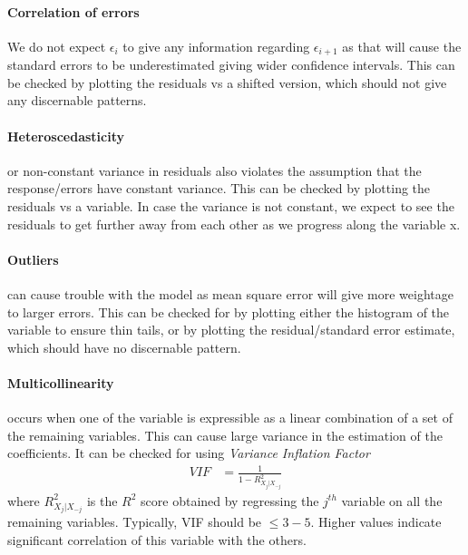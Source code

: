 \documentclass[../statistical_learning_notes.tex]{subfiles}
\begin{document}
\paragraph{Correlation of errors} We do not expect $\epsilon_{i}$ to give any information regarding $\epsilon_{i+1}$ as that will cause the standard errors to be underestimated giving wider confidence intervals. This can be checked by plotting the residuals vs a shifted version, which should not give any discernable patterns.

\paragraph{Heteroscedasticity} or non-constant variance in residuals also violates the assumption that the response/errors have constant variance. This can be checked by plotting the residuals vs a variable. In case the variance is not constant, we expect to see the residuals to get further away from each other as we progress along the variable x.

\paragraph{Outliers} can cause trouble with the model as mean square error will give more weightage to larger errors. This can be checked for by plotting either the histogram of the variable to ensure thin tails, or by plotting the residual/standard error estimate, which should have no discernable pattern.

\paragraph{Multicollinearity} occurs when one of the variable is expressible as a linear combination of a set of the remaining variables. This can cause large variance in the estimation of the coefficients. It can be checked for using \emph{Variance Inflation Factor}
\begin{align*}
    VIF &= \frac{1}{1 - R_{X_{j}|X_{-j}}^{2}}
\end{align*}
where $R_{X_{j}|X_{-j}}^{2}$ is the $R^{2}$ score obtained by regressing the $j^{th}$ variable on all the remaining variables. Typically, VIF should be $\leq 3-5$. Higher values indicate significant correlation of this variable with the others.
\end{document}
